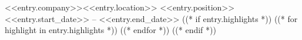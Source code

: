   \resumeSubheading
    {<<entry.company>>}{<<entry.location>>}
    {<<entry.position>>}{<<entry.start_date>> -- <<entry.end_date>>}
    ((* if entry.highlights *))
    \resumeListStart
      ((* for highlight in entry.highlights *))
      ((* endfor *))
    \resumeListEnd
    ((* endif *))
